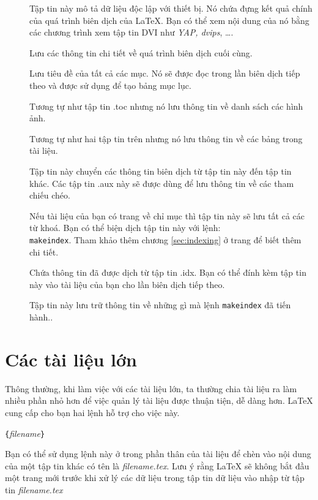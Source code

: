 \begin{description}
\item[]  Tập tin này mô tả dữ liệu độc lập với thiết bị. Nó chứa đựng kết quả chính của quá trình biên dịch của \LaTeX{}. Bạn có thể xem nội dung của nó bằng các chương trình xem tập tin DVI như \emph{YAP, dvips}, \ldots.

\item[] Lưu các thông tin chi tiết về quá trình biên dịch cuối cùng.

\item[] Lưu tiêu đề của tất cả các mục. Nó sẽ được đọc trong lần biên dịch tiếp theo và được sử dụng để tạo bảng mục lục.

\item[] Tương tự như tập tin .toc nhưng nó lưu thông tin về danh sách các hình ảnh.

\item[] Tương tự như hai tập tin trên nhưng nó lưu thông tin về các bảng trong tài liệu.

\item[] Tập tin này chuyển các thông tin biên dịch từ tập tin này đến tập tin khác. Các tập tin .aux này sẽ được dùng để lưu thông tin về các tham chiếu chéo.

\item[] Nếu tài liệu của bạn có trang về chỉ mục thì tập tin này sẽ lưu tất cả các từ khoá. Bạn có thể biện dịch tập tin này với lệnh:\\
  \texttt{makeindex}. Tham khảo thêm chương \ref{sec:indexing} ở trang \pageref{sec:indexing} để biết thêm chi tiết.

\item[] Chứa thông tin đã được dịch từ tập tin .idx. Bạn có thể đính kèm tập tin này vào tài liệu của bạn cho lần biên dịch tiếp theo.

\item[] Tập tin này lưu trữ thông tin về những gì mà lệnh \texttt{makeindex} đã tiến hành..
\end{description}


\section{Các tài liệu lớn}
Thông thường, khi làm việc với các tài liệu lớn, ta thường chia tài liệu ra làm nhiều phần nhỏ hơn để việc quản lý tài liệu được thuận tiện, dễ dàng hơn. \LaTeX{} cung cấp cho bạn hai lệnh hỗ trợ cho việc này.
\begin{lscommand}
\verb|{|\emph{filename}\verb|}|
\end{lscommand}
\noindent Bạn có thể sử dụng lệnh này ở trong phần thân của tài liệu để chèn vào nội dung của một tập tin khác có tên là
\emph{filename.tex}. Lưu ý rằng \LaTeX{} sẽ không bắt đầu một trang mới trước khi xử lý các dữ liệu trong tập tin dữ liệu vào nhập từ tập tin \emph{filename.tex}

